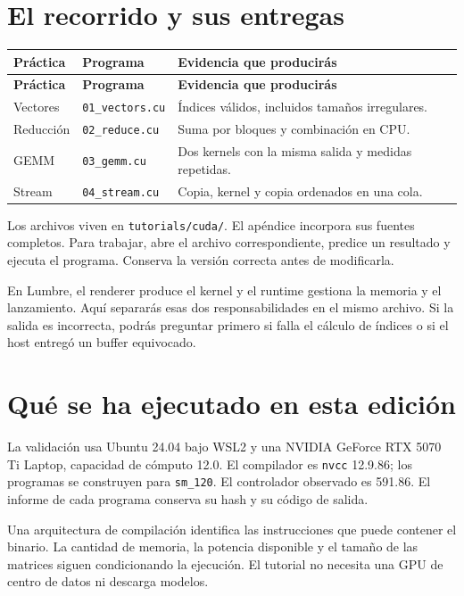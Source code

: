 \documentclass[12pt,a4paper,oneside]{report}
\begin{document}
\section{El recorrido y sus entregas}
{\small
\begin{longtable}{@{}P{0.28\textwidth}P{0.32\textwidth}P{0.34\textwidth}@{}}
\toprule
\textbf{Práctica} & \textbf{Programa} & \textbf{Evidencia que producirás}\\
\midrule
\endfirsthead
\toprule
\textbf{Práctica} & \textbf{Programa} & \textbf{Evidencia que producirás}\\
\midrule
\endhead
Vectores & \texttt{01\_vectors.cu} & Índices válidos, incluidos tamaños irregulares.\\
Reducción & \texttt{02\_reduce.cu} & Suma por bloques y combinación en CPU.\\
GEMM & \texttt{03\_gemm.cu} & Dos kernels con la misma salida y medidas repetidas.\\
Stream & \texttt{04\_stream.cu} & Copia, kernel y copia ordenados en una cola.\\
\bottomrule
\end{longtable}
}
Los archivos viven en \texttt{tutorials/cuda/}. El apéndice incorpora sus fuentes completos. Para trabajar, abre el archivo correspondiente, predice un resultado y ejecuta el programa. Conserva la versión correcta antes de modificarla.

\begin{idea}
En Lumbre, el renderer produce el kernel y el runtime gestiona la memoria y el lanzamiento. Aquí separarás esas dos responsabilidades en el mismo archivo. Si la salida es incorrecta, podrás preguntar primero si falla el cálculo de índices o si el host entregó un buffer equivocado.

\end{idea}
\section{Qué se ha ejecutado en esta edición}
La validación usa Ubuntu 24.04 bajo WSL2 y una NVIDIA GeForce RTX 5070 Ti Laptop, capacidad de cómputo 12.0. El compilador es \texttt{nvcc} 12.9.86; los programas se construyen para \texttt{sm\_120}. El controlador observado es 591.86. El informe de cada programa conserva su hash y su código de salida.

Una arquitectura de compilación identifica las instrucciones que puede contener el binario. La cantidad de memoria, la potencia disponible y el tamaño de las matrices siguen condicionando la ejecución. El tutorial no necesita una GPU de centro de datos ni descarga modelos.
\end{document}
